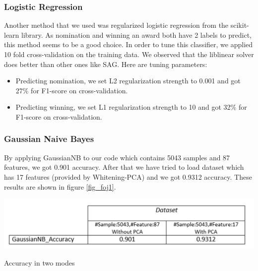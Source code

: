 \documentclass[journal,transmag]{IEEEtran}
\begin{document}
			\subsubsection{Logistic Regression}
			Another method that we used was regularized logistic regression from the scikit-learn library. As nomination and winning an award both have 2 labels to predict, this method seems to be a good choice. In order to tune this classifier, we applied 10 fold cross-validation on the training data. We observed that the liblinear solver does better than other ones like SAG. Here are tuning parameters:
			\begin{itemize}
				\item Predicting nomination, we set L2 regularization strength to 0.001 and got 27\% for F1-score on cross-validation.
				\item Predicting winning, we set L1 regularization strength to 10 and got 32\% for F1-score on cross-validation.
			\end{itemize}
			
			
			\subsubsection{Gaussian Naive Bayes}
By applying GaussianNB to our code which contains 5043 samples and 87 features, we got 0.901 accuracy. After that we have tried to load dataset which has 17 features (provided by Whitening-PCA) and we got 0.9312 accuracy. These results are shown in figure \ref{fig_foj1}.	
\begin{table}
\includegraphics[scale=.26]{figfoj1}
 \caption{Accuracy in two modes}
\label{fig_foj1}
\end{table}
\end{document}
